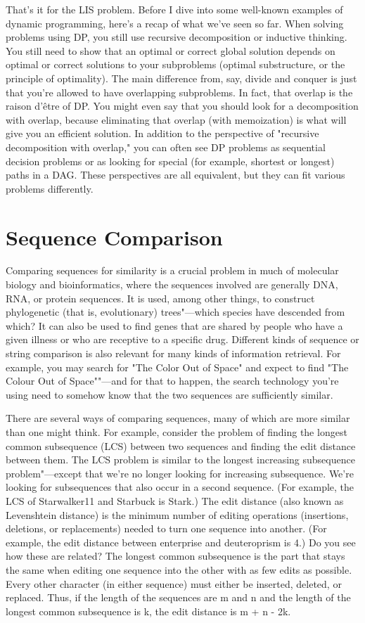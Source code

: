 That's it for the LIS problem. Before I dive into some well-known examples of dynamic programming, here's a recap of what we've seen so far. When solving problems using DP, you still use recursive decomposition or inductive thinking. You still need to show that an optimal or correct global solution depends on optimal or correct solutions to your subproblems (optimal substructure, or the principle of optimality). The main difference from, say, divide and conquer is just that you're allowed to have overlapping subproblems. In fact, that overlap is the raison d'être of DP. You might even say that you should look for a decomposition with overlap, because eliminating that overlap (with memoization) is what will give you an efficient solution. In addition to the perspective of "recursive decomposition with overlap," you can often see DP problems as sequential decision problems or as looking for special (for example, shortest or longest) paths in a DAG. These perspectives are all equivalent, but they can fit various problems differently.

\section{Sequence Comparison}

Comparing sequences for similarity is a crucial problem in much of molecular biology and
bioinformatics, where the sequences involved are generally DNA, RNA, or protein sequences. It is used, among other things, to construct phylogenetic (that is, evolutionary) trees"---which species have descended from which? It can also be used to find genes that are shared by people who have a given illness or who are receptive to a specific drug. Different kinds of sequence or string comparison is also relevant for many kinds of information retrieval. For example, you may search for "The Color Out of Space" and expect to find "The Colour Out of Space""---and for that to happen, the search technology you're using need to somehow know that the two sequences are sufficiently similar.

There are several ways of comparing sequences, many of which are more similar than one might
think. For example, consider the problem of finding the longest common subsequence (LCS) between two sequences and finding the edit distance between them. The LCS problem is similar to the longest increasing subsequence problem"---except that we're no longer looking for increasing subsequence. We're looking for subsequences that also occur in a second sequence. (For example, the LCS of Starwalker11 and Starbuck is Stark.) The edit distance (also known as Levenshtein distance) is the minimum number of editing operations (insertions, deletions, or replacements) needed to turn one sequence into another. (For example, the edit distance between enterprise and deuteroprism is 4.) Do you see how these are related? The longest common subsequence is the part that stays the same when editing one sequence into the other with as few edits as possible. Every other character (in either sequence) must either be inserted, deleted, or replaced. Thus, if the length of the sequences are m and n and the length of the longest common subsequence is k, the edit distance is m + n - 2k.

